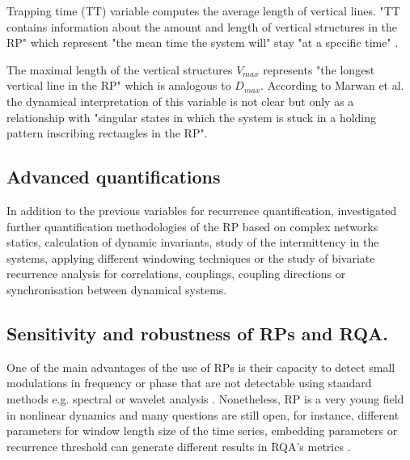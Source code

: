 Trapping time (TT) variable computes the average length of vertical lines. 
"TT contains information about the amount and length of vertical 
structures in the RP" which represent 
"the mean time the system will" stay "at a specific time" \cite{marwan2015}.

The maximal length of the vertical structures $V_{max}$ represents 
"the longest vertical line in the RP" which is analogous to $D_{max}$. 
According to Marwan et al. \cite{marwan2015} the dynamical interpretation 
of this variable is not clear but only as a relationship with 
"singular states in which the system is stuck in a holding pattern
inscribing rectangles in the RP".
%
 

\subsection{Advanced quantifications}
In addition to the previous variables for recurrence quantification, 
\cite{marwan2007, marwan2015} investigated further quantification methodologies 
of the RP based on complex networks statics, calculation of dynamic invariants, 
study of the intermittency in the systems, applying different windowing techniques or the study of bivariate recurrence analysis for correlations, 
couplings, coupling directions or synchronisation between dynamical systems.


 
\subsection{Sensitivity and robustness of RPs and RQA.}

One of the main advantages of the use of RPs is their capacity to detect 
small modulations in frequency or phase that are not detectable using standard 
methods e.g. spectral or wavelet analysis \cite{marwan2011}.
Nonetheless, RP is a very young field in nonlinear dynamics
and many questions are still open, for instance, 
different parameters for window length size of the time series,
embedding parameters or recurrence threshold can generate different 
results in RQA's metrics \cite{marwan2011, eckmann1987}.

